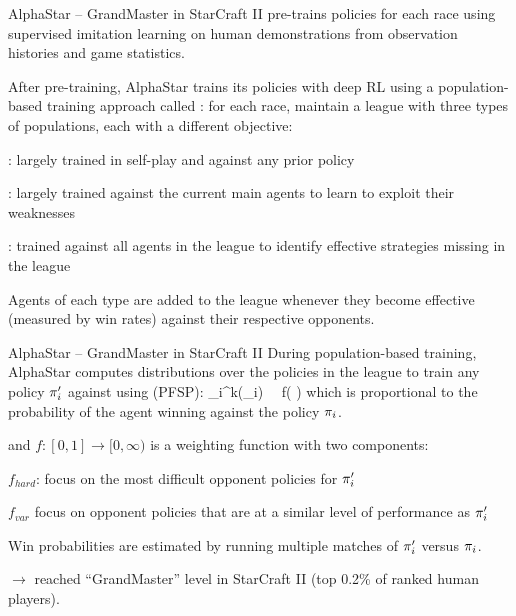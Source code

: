 \begin{frame}[t]{AlphaStar -- GrandMaster in StarCraft II}
     pre-trains policies for each race using supervised imitation learning on human demonstrations from observation histories and game statistics.

    \pause

    After pre-training, AlphaStar trains its policies with deep RL using a population-based training approach called : for each race, maintain a league with three types of populations, each with a different objective:
    \blist
        \item<3-> : largely trained in self-play and against any prior policy
        \item<4-> : largely trained against the current main agents to learn to exploit their weaknesses
        \item<5-> : trained against all agents in the league to identify effective strategies missing in the league
    \elist

    \pause
    \pause
    \pause
    \pause

    \vspace{-.5em}
    Agents of each type are added to the league whenever they become effective (measured by win rates) against their respective opponents.
\end{frame}

\begin{frame}[t]{AlphaStar -- GrandMaster in StarCraft II}
    During population-based training, AlphaStar computes distributions over the policies in the league to train any policy $\pi'_i$ against using  (PFSP):
    \bmath
	\delta_i^k(\pol_i) \, \propto \ f\left(  \right)
    \emath
    which is proportional to the probability of the agent winning against the policy $\pi_i$.

    \pause

    and $f : [0,1] \to [0,\infty)$ is a weighting function with two components:
    \blist
	\item $f_{hard}$: focus on the most difficult opponent policies for $\pi'_i$
	\item $f_{var}$ focus on opponent policies that are at a similar level of performance as $\pi'_i$
    \elist

    \pause

    Win probabilities are estimated by running multiple matches of $\pi'_i$ versus $\pi_i$.

    \pause

    $\rightarrow$ reached ``GrandMaster'' level in StarCraft II (top 0.2\% of ranked human players).
\end{frame}

